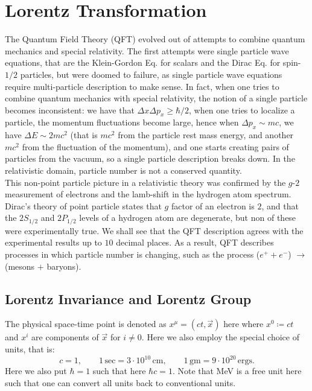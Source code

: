 \documentclass[11pt, onesided]{book}
\theoremstyle{break}
\theoremstyle{break}
\begin{document}
\chapter{Lorentz Transformation}
\quad The Quantum Field Theory (QFT) evolved out of attempts to combine quantum mechanics and special relativity. The first attempts were single particle wave equations, that are the Klein-Gordon Eq. for scalars and the Dirac Eq. for spin-$1/2$ particles, but were doomed to failure, as single particle wave equations require multi-particle description to make sense. In fact, when one tries to combine quantum mechanics with special relativity, the notion of a single particle becomes inconsistent: we have that $\Delta x \Delta p_x \geq \hbar/2$, when one tries to localize a particle, the momentum fluctuations become large, hence when $\Delta p_x \sim mc$, we have $\Delta E \sim 2mc^2$ (that is $mc^2$ from the particle rest mass energy, and another $mc^2$ from the fluctuation of the momentum), and one starts creating pairs of particles from the vacuum, so a single particle description breaks down. In the relativistic domain, particle number is not a conserved quantity. \\

\quad This non-point particle picture in a relativistic theory was confirmed by the $g$-$2$ measurement of electrons and the lamb-shift in the hydrogen atom spectrum. Dirac's theory of point particle states that $g$ factor of an electron is $2$, and that the $2S_{1/2}$ and $2P_{1/2}$ levels of a hydrogen atom are degenerate, but non of these were experimentally true. We shall see that the QFT description agrees with the experimental results up to $10$ decimal places. As a result, QFT describes processes in which particle number is changing, such as the process ($e^+ + e^-$) $\to$ (mesons $+$ baryons). 
\hfill\break
\section[Lorentz Invariance and Lorentz Group]{\color{red}Lorentz Invariance and Lorentz Group\color{black}}
The physical space-time point is denoted as $x^\mu = (ct, \vec{x})$ here where $x^0\coloneqq ct$ and $x^i$ are components of $\vec{x}$ for $i \neq 0$. Here we also employ the special choice of units, that is: 
$$c=1, \qquad 1\,\text{sec} =3\cdot 10^{10}\,\text{cm},\qquad 1\,\text{gm}=9\cdot 10^{20}\,\text{ergs}.$$ 
Here we also put $\hbar = 1$ such that here $\hbar c = 1$. Note that MeV is a free unit here such that one can convert all units back to conventional units. \\
\end{document}
